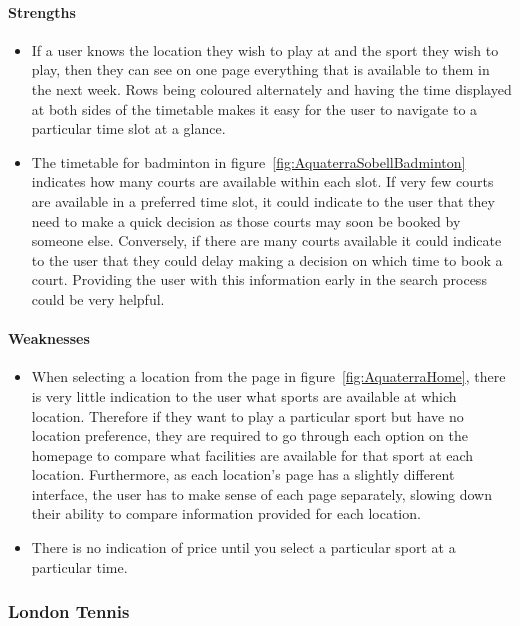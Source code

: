 \paragraph{Strengths}
\begin{itemize}
	\item If a user knows the location they wish to play at and the sport they
		wish to play,  then they can see on one page everything that is
		available to them in the next week. Rows being coloured alternately and
		having the time displayed at both sides of the timetable makes it easy
		for the user to navigate to a particular time slot at a glance.
	\item The timetable for badminton in
		figure~\ref{fig:AquaterraSobellBadminton} indicates how many courts are
		available within each slot. If very few courts are available in a
		preferred time slot, it could indicate to the user that they need to
		make a quick decision as those courts may soon be booked by someone
		else. Conversely, if there are many courts available it could indicate
		to the user that they could delay making a decision on which time to
		book a court. Providing the user with this information early in the
		search process could be very helpful.
\end{itemize}

\paragraph{Weaknesses}
\begin{itemize}
	\item When selecting a location from the page in
		figure~\ref{fig:AquaterraHome}, there is very little indication to the
		user what sports are available at which location. Therefore if they
		want to play a particular sport but have no location preference, they
		are required to go through each option on the homepage to compare what
		facilities are available for that sport at each location. Furthermore,
		as each location's page has a slightly different interface, the user
		has to make sense of each page separately, slowing down their ability
		to compare information provided for each location.
	\item There is no indication of price until you select a particular sport
		at a particular time.
\end{itemize}

\subsubsection{London Tennis}
\label{ssub:london_tennis}

